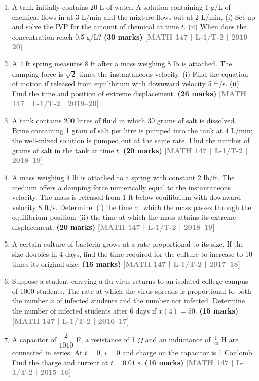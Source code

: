 \documentclass[12pt,a4paper]{article}
\newcommand{\yr}[1]{\hfill\textcolor{gray}{\small\textbf{[#1]}}}
\newcommand{\mk}[1]{\textcolor{orange!70!black}{\small\textbf{(#1 marks)}}}
\begin{document}
\begin{enumerate}
\item A tank initially contains 20 L of water. A solution containing 1 g/L of chemical flows in at 3 L/min and the mixture flows out at 2 L/min. (i) Set up and solve the IVP for the amount of chemical at time $t$. (ii) When does the concentration reach 0.5 g/L?
\mk{30} \yr{MATH 147 | L-1/T-2 | 2019--20}

\item A 4 ft spring measures 8 ft after a mass weighing 8 lb is attached. The damping force is $\sqrt{2}$ times the instantaneous velocity. (i) Find the equation of motion if released from equilibrium with downward velocity 5 ft/s. (ii) Find the time and position of extreme displacement.
\mk{26} \yr{MATH 147 | L-1/T-2 | 2019--20}

\item A tank contains 200 litres of fluid in which 30 grams of salt is dissolved. Brine containing 1 gram of salt per litre is pumped into the tank at 4 L/min; the well-mixed solution is pumped out at the same rate. Find the number of grams of salt in the tank at time $t$.
\mk{20} \yr{MATH 147 | L-1/T-2 | 2018--19}

\item A mass weighing 4 lb is attached to a spring with constant 2 lb/ft. The medium offers a damping force numerically equal to the instantaneous velocity. The mass is released from 1 ft below equilibrium with downward velocity 8 ft/s. Determine: (i) the time at which the mass passes through the equilibrium position; (ii) the time at which the mass attains its extreme displacement.
\mk{20} \yr{MATH 147 | L-1/T-2 | 2018--19}

\item A certain culture of bacteria grows at a rate proportional to its size. If the size doubles in 4 days, find the time required for the culture to increase to 10 times its original size.
\mk{16} \yr{MATH 147 | L-1/T-2 | 2017--18}

\item Suppose a student carrying a flu virus returns to an isolated college campus of 1000 students. The rate at which the virus spreads is proportional to both the number $x$ of infected students and the number not infected. Determine the number of infected students after 6 days if $x(4)=50$.
\mk{15} \yr{MATH 147 | L-1/T-2 | 2016--17}

\item A capacitor of $\dfrac{2}{1010}$ F, a resistance of 1 $\Omega$ and an inductance of $\tfrac{1}{20}$ H are connected in series. At $t=0$, $i=0$ and charge on the capacitor is 1 Coulomb. Find the charge and current at $t=0.01$ s.
\mk{16} \yr{MATH 147 | L-1/T-2 | 2015--16}

\end{enumerate}
\end{document}
